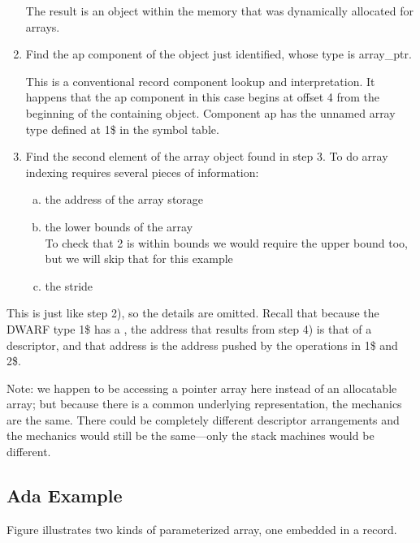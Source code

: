 \begin{enumerate}[1. ]
The result is an object within the memory that was dynamically
allocated for arrays.

\item  Find the ap component of the object just identified,
whose type is array\_ptr.

This is a conventional record component lookup and
interpretation. It happens that the ap component in this case
begins at offset 4 from the beginning of the containing object.
Component ap has the unnamed array type defined at 1\$ in the
symbol table.

\item  Find the second element of the array object found in step 3. To do array indexing requires
several pieces of information:
\begin{enumerate}[a) ]
\item  the address of the array storage

\item  the lower bounds of the array \\
\lbrack To check that 2 is within bounds we would require the upper
bound too, but we will skip that for this example \rbrack

\item  the stride

\end{enumerate}
\end{enumerate}

This is just like step 2), so the details are omitted. Recall
that because the DWARF type 1\$ has a ,
the address that results from step 4) is that of a
descriptor, and that address is the address pushed by the
 operations in 1\$ and 2\$.

Note: we happen to be accessing a pointer array here instead
of an allocatable array; but because there is a common
underlying representation, the mechanics are the same. There
could be completely different descriptor arrangements and the
mechanics would still be the same---only the stack machines
would be different.



\subsection{Ada Example}
\label{app:adaexample}

Figure 
illustrates two kinds of  
parameterized array, one embedded in a record.


